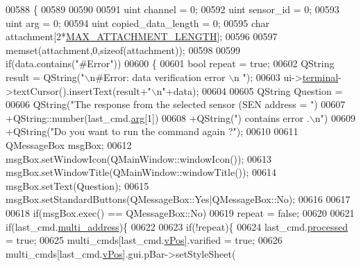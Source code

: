 \begin{DoxyCode}
00588                                                                \{
00589 
00590     
00591     uint  channel              = 0;
00592     uint  sensor\_id            = 0;
00593     uint  arg                  = 0;
00594     uint  copied\_data\_length   = 0;
00595     \textcolor{keywordtype}{char} attachment[2*\hyperlink{a00031_aa8abe3a822c64813f7aaba3ca7e3db9c}{MAX\_ATTACHMENT\_LENGTH}];
00596 
00597     memset(attachment,0,\textcolor{keyword}{sizeof}(attachment));
00598 
00599         \textcolor{keywordflow}{if}(data.contains(\textcolor{stringliteral}{"#Error"}))
00600         \{
00601              \textcolor{keywordtype}{bool} repeat = \textcolor{keyword}{true};
00602              QString result =  QString(\textcolor{stringliteral}{"\(\backslash\)n#Error: data verification error \(\backslash\)n "});
00603              ui->\hyperlink{a00027_aae71c46ea4546df5994735dee573b2dd}{terminal}->textCursor().insertText(result+\textcolor{stringliteral}{"\(\backslash\)n"}+data);
00604 
00605              QString Question =
00606                      QString(\textcolor{stringliteral}{"The response from the selected sensor (SEN address = "})
00607                      +QString::number(last\_cmd.\hyperlink{a00001_a56e6c2d7315d0ae60a51e8b140c9cfe4}{arg}[1])
00608                      +QString(\textcolor{stringliteral}{") contains error .\(\backslash\)n"})
00609                      +QString(\textcolor{stringliteral}{"Do you want to run the command again ?"});
00610 
00611              QMessageBox msgBox;
00612              msgBox.setWindowIcon(QMainWindow::windowIcon());
00613              msgBox.setWindowTitle(QMainWindow::windowTitle());
00614              msgBox.setText(Question);
00615              msgBox.setStandardButtons(QMessageBox::Yes|QMessageBox::No);
00616 
00617 
00618              \textcolor{keywordflow}{if}(msgBox.exec() == QMessageBox::No)
00619                       repeat = \textcolor{keyword}{false};
00620 
00621                  \textcolor{keywordflow}{if}(last\_cmd.\hyperlink{a00001_a8e69b971c61ced27a7567efd2bf0db59}{multi\_address})\{
00622 
00623                      \textcolor{keywordflow}{if}(!repeat)\{
00624                      last\_cmd.\hyperlink{a00001_a3e88f779da9798a5da7dda227e2ca388}{processed} = \textcolor{keyword}{true};
00625                      multi\_cmds[last\_cmd.\hyperlink{a00001_a2b48b371fd84be2a8ad581b1ad708b88}{vPos}].varified = \textcolor{keyword}{true};
00626                      multi\_cmds[last\_cmd.\hyperlink{a00001_a2b48b371fd84be2a8ad581b1ad708b88}{vPos}].gui.pBar->setStyleSheet(

\end{DoxyCode}
